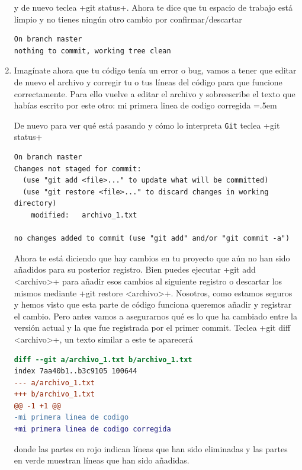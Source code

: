 \documentclass[a4paper,10pt]{article}
\newenvironment{cverbatim}
 {\SaveVerbatim{cverb}}
 {\endSaveVerbatim
  \flushleft\fboxrule=0pt\fboxsep=.5em
  \colorbox{bg}{\BUseVerbatim{cverb}}%
  \endflushleft
}
\begin{document}
\begin{enumerate}
    y de nuevo teclea \cverb+git status+. Ahora te dice que tu espacio de trabajo está limpio y no tienes ningún otro cambio por confirmar/descartar

    \begin{lstlisting}[style=custom]
On branch master
nothing to commit, working tree clean
    \end{lstlisting}
    
    \item Imagínate ahora que tu código tenía un error o bug, vamos a tener que editar de nuevo el archivo y corregir tu  o tus líneas del código para que funcione correctamente. Para ello vuelve a editar el archivo y sobreescribe el texto que habías escrito por este otro:
    \begin{cverbatim}
mi primera linea de codigo corregida
    \end{cverbatim}
      
    De nuevo para ver qué está pasando y cómo lo interpreta \verb+Git+ teclea \cverb+git status+
    
    \begin{lstlisting}[style=custom]
On branch master
Changes not staged for commit:
  (use "git add <file>..." to update what will be committed)
  (use "git restore <file>..." to discard changes in working directory)
	modified:   archivo_1.txt

no changes added to commit (use "git add" and/or "git commit -a")
    \end{lstlisting}
    
    Ahora te está diciendo que hay cambios en tu proyecto que aún no han sido añadidos para su posterior registro. Bien puedes ejecutar \cverb+git add <archivo>+ para añadir esos cambios al siguiente registro o descartar los mismos mediante \cverb+git restore <archivo>+. Nosotros, como estamos seguros y hemos visto que esta parte de código funciona queremos añadir y registrar el cambio. Pero antes vamos a asegurarnos qué es lo que ha cambiado entre la versión actual y la que fue registrada por el primer commit. Teclea \cverb+git diff <archivo>+, un texto similar a este te aparecerá
    
    \begin{lstlisting}[style=custom, language=diff]
diff --git a/archivo_1.txt b/archivo_1.txt
index 7aa40b1..b3c9105 100644
--- a/archivo_1.txt
+++ b/archivo_1.txt
@@ -1 +1 @@
-mi primera linea de codigo
+mi primera linea de codigo corregida
    \end{lstlisting}
    donde las partes en rojo indican líneas que han sido eliminadas y las partes en verde muestran líneas que han sido añadidas.
    

\end{enumerate}
\end{document}
